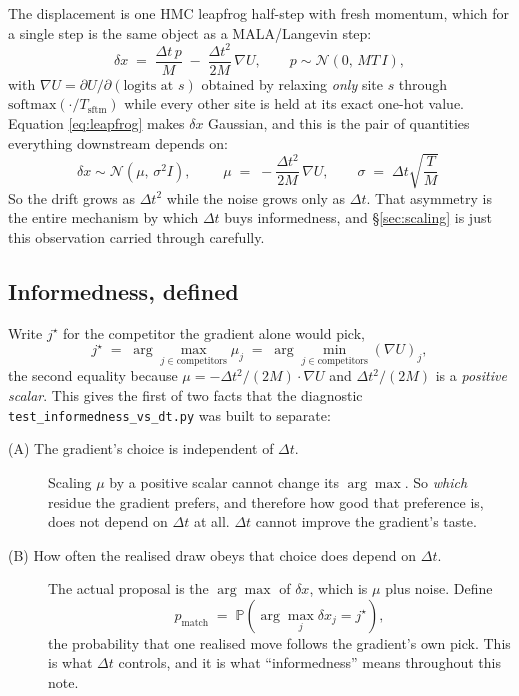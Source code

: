 \documentclass[11pt,a4paper]{article}
\newcommand{\dt}{\Delta t}
\newcommand{\gradU}{\nabla U}
\newcommand{\pmatch}{p_{\mathrm{match}}}
\newcommand{\Mass}{M}
\begin{document}
The displacement is one HMC leapfrog half-step with fresh momentum, which for
a single step is the same object as a MALA/Langevin step:
\begin{equation}
  \delta x \;=\; \frac{\dt\,p}{\Mass} \;-\; \frac{\dt^{2}}{2\Mass}\,\gradU,
  \qquad p \sim \mathcal{N}\!\left(0,\, \Mass T\, I\right),
  \label{eq:leapfrog}
\end{equation}
with $\gradU = \partial U/\partial(\text{logits at } s)$ obtained by relaxing
\emph{only} site $s$ through $\mathrm{softmax}(\cdot/T_{\mathrm{sftm}})$ while
every other site is held at its exact one-hot value. Equation
\eqref{eq:leapfrog} makes $\delta x$ Gaussian, and this is the pair of
quantities everything downstream depends on:
\begin{equation}
  \delta x \sim \mathcal{N}\!\left(\mu,\, \sigma^{2} I\right),
  \qquad
  \boxed{\;\mu \;=\; -\frac{\dt^{2}}{2\Mass}\,\gradU,
         \qquad
         \sigma \;=\; \dt\sqrt{\frac{T}{\Mass}}\;}
  \label{eq:musigma}
\end{equation}
So the drift grows as $\dt^{2}$ while the noise grows only as $\dt$. That
asymmetry is the entire mechanism by which $\dt$ buys informedness, and
\S\ref{sec:scaling} is just this observation carried through carefully.

\subsection{Informedness, defined}

Write $j^{\star}$ for the competitor the gradient alone would pick,
\begin{equation}
  j^{\star} \;=\; \arg\max_{j \in \text{competitors}} \mu_{j}
            \;=\; \arg\min_{j \in \text{competitors}} (\gradU)_{j},
  \label{eq:jstar}
\end{equation}
the second equality because $\mu = -\dt^{2}/(2\Mass)\cdot\gradU$ and
$\dt^{2}/(2\Mass)$ is a \emph{positive scalar}. This gives the first of two
facts that the diagnostic
\texttt{test\_informedness\_vs\_dt.py} was built to separate:

\begin{description}
  \item[(A) The gradient's choice is independent of $\dt$.] Scaling $\mu$ by a
        positive scalar cannot change its $\arg\max$. So \emph{which} residue
        the gradient prefers, and therefore how good that preference is, does
        not depend on $\dt$ at all. $\dt$ cannot improve the gradient's taste.
  \item[(B) How often the realised draw obeys that choice does depend on
        $\dt$.] The actual proposal is the $\arg\max$ of $\delta x$, which is
        $\mu$ plus noise. Define
        \begin{equation}
          \pmatch \;=\; \mathbb{P}\!\left(
            \arg\max_{j} \delta x_{j} = j^{\star} \right),
          \label{eq:pmatch}
        \end{equation}
        the probability that one realised move follows the gradient's own
        pick. This is what $\dt$ controls, and it is what ``informedness''
        means throughout this note.
\end{description}
\end{document}
